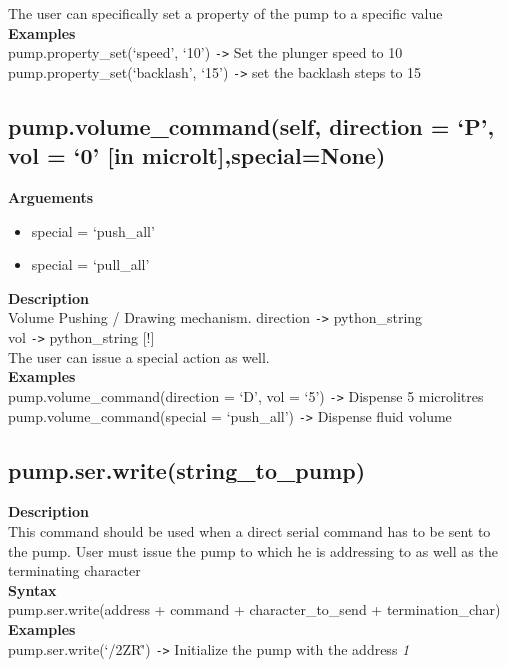 \documentclass[a4paper]{article}
\begin{document}
The user can specifically set a property of the pump to a specific value\\
\textbf{Examples}\\
pump.property\_set(`speed', `10') \verb|->| Set the plunger speed to 10\\
pump.property\_set(`backlash', `15') \verb|->| set the backlash steps to 15

\subsection{pump.volume\_command(self, direction = `P', vol = `0' [in microlt],special=None)}
\textbf{Arguements}
\begin{itemize}
    \item special = `push\_all'
    \item special = `pull\_all'
\end{itemize}
\textbf{Description}\\
Volume Pushing / Drawing mechanism.
direction \verb|->| python\_string\\
vol \verb|->| python\_string [!]\\
The user can issue a special action as well.\\
\textbf{Examples}\\
pump.volume\_command(direction = `D', vol = `5') \verb|->| Dispense 5 microlitres\\
pump.volume\_command(special = `push\_all') \verb|->| Dispense fluid volume

\subsection{\mbox{pump.ser.write(string\_to\_pump)}}
\textbf{Description}\\
This command should be used when a direct serial command has to be sent to the pump.
User must issue the pump to which he is addressing to as well as the terminating character\\
\textbf{Syntax}\\
pump.ser.write(address + command + character\_to\_send + termination\_char)\\
\textbf{Examples}\\
pump.ser.write(`/2ZR\r') \verb|->| Initialize the pump with the address \textit{1}
\end{document}
